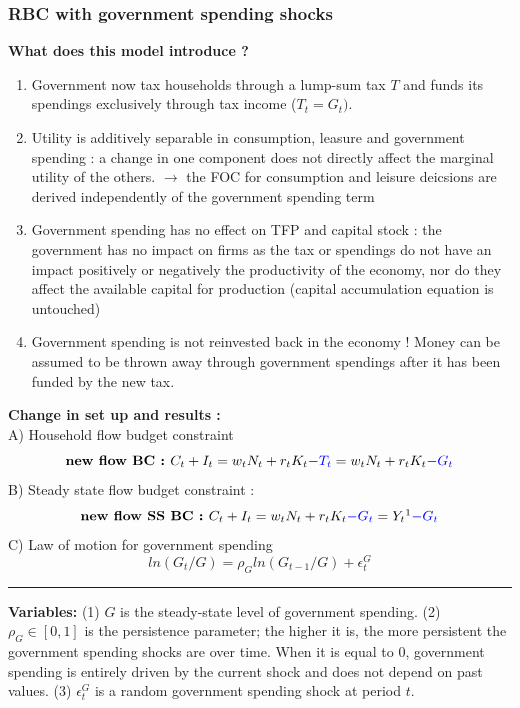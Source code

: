 \documentclass{article}
\begin{document}
\subsubsection{RBC with government spending shocks}
\textbf{What does this model introduce ?}
\begin{enumerate}
    \item Government now tax households through a lump-sum tax $T$ and funds its spendings exclusively through tax income ($T_t=G_t)$. 
    \item Utility is additively separable in consumption, leasure and government spending :  a change in one component does not directly affect the marginal utility of the others. $\rightarrow$  the FOC for consumption and leisure deicsions are derived independently of the government spending term
    \item Government spending has no effect on TFP and capital stock : the government has no impact on firms as the tax or spendings do not have an impact positively or negatively the productivity of the economy, nor do they affect the available capital for production (capital accumulation equation is untouched)
    \item Government spending is not reinvested back in the economy ! Money can be assumed to be thrown away through government spendings after it has been funded by the new tax. 
\end{enumerate}
\textbf{Change in set up and results : }\\
A) Household flow budget constraint
\begin{equation}
    \textbf{new flow BC : } C_t + I_t = w_tN_t+r_tK_t\textcolor{blue}{-T_t} = w_tN_t+r_tK_t\textcolor{blue}{-G_t}
\end{equation}
B) Steady state flow budget constraint :
\begin{equation}
    \textbf{new flow SS BC : } C_t+I_t = w_tN_t+r_tK_t\textcolor{blue}{-G_t} = Y_t \footnotemark   \textcolor{blue}{- G_t}
\end{equation}
C) Law of motion for government spending 
\begin{equation}
    ln(G_t/G)=\rho_Gln(G_{t-1}/G)+\epsilon_t^G 
\end{equation}
\noindent\rule{\textwidth}{0.4pt}
 {\small  
 \textbf{Variables:} {\scriptsize (1) $G$ is the steady-state level of government spending. (2) $\rho_G\in[0,1]$ is the persistence parameter; the higher it is, the more persistent the government spending shocks are over time. When it is equal to 0, government spending is entirely driven by the current shock and does not depend on past values. (3) $\epsilon_t^G$ is a random government spending shock at period $t$.} 
 } \par\vspace{0.5cm}\par  
\end{document}
